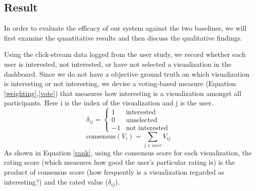 \subsection{Result}
In order to evaluate the efficacy of our system against the two baselines, we will first examine the quantitative results and then discuss the qualitative findings.

 Using the click-stream data logged from the user study, we record whether each user is interested, not interested, or have not selected a visualization in the dashboard. %
Since we do not have a objective ground truth on which visualization is interesting or not interesting, we devise a voting-based measure (Equation \ref{weighting},\ref{vote}) that measures how interesting is a visualization amongst all participants. Here i is the index of the visualization and j is the user.
\begin{equation}\label{weighting}
	\delta_{ij}= \left\{\begin{matrix}
	 1& \textrm{interested}
	\\ 0 & \textrm{unselected}
	\\ -1 & \textrm{not interested}
	\end{matrix}\right.
\end{equation}
\begin{equation}\label{vote}
\textrm{consensus}(V_i) =\sum_{j\in user} V_{ij}
\end{equation}
As shown in Equation \ref{rank}, using the consensus score for each visualization, the rating score (which measures how good the user's particular rating is) is the product of consensus score (how frequently is a visualization regarded as interesting?) and the rated value ($\delta_{ij}$).
